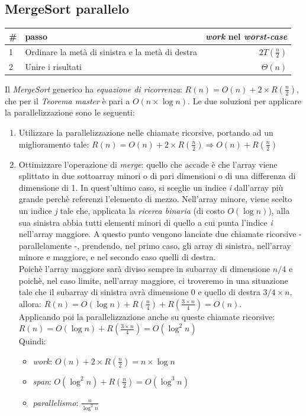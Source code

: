 \newpage

\subsection{MergeSort parallelo}
\begin{center}
	\begin{tabular}{| l | l | r |}
		\hline
		\textbf{\#} & \textbf{passo} & \textbf{\textit{work} nel \textit{worst-case}} \\ \hline
		1 & Ordinare la metà di sinistra e la metà di destra & $2T(\frac{n}{2})$ \\
		2 & Unire i risultati & $\Theta(n)$ \\
		\hline
	\end{tabular}
\end{center}
Il \textit{MergeSort} generico ha \textit{equazione di ricorrenza}: $R(n) = O(n) + 2\times R(\frac{n}{2})$, che per il \textit{Teorema master} \`e pari a $O(n\times \log n)$.
Le due soluzioni per applicare la parallelizzazione sono le seguenti:
\begin{enumerate}
	\item Utilizzare la parallelizzazione nelle chiamate ricorsive, portando ad un miglioramento tale: $R(n) = O(n) + 2\times R(\frac{n}{2}) \Rightarrow O(n) + R(\frac{n}{2})$
	\item Ottimizzare l'operazione di \textit{merge}: quello che accade \`e che l'array viene splittato in due sottoarray minori o di pari dimensioni o di una differenza di dimensione di 1. In quest'ultimo caso, si sceglie un indice \textit{i} dall'array pi\`u grande perch\`e referenzi l'elemento di mezzo. Nell'array minore, viene scelto un indice \textit{j} tale che, applicata la \textit{ricerca binaria} (di costo $O(\log n)$), alla sua sinistra abbia tutti elementi minori di quello a cui punta l'indice \textit{i} nell'array maggiore. A questo punto vengono lanciate due chiamate ricorsive - parallelamente -, prendendo, nel primo caso, gli array di sinistra, nell'array minore e maggiore, e nel secondo caso quelli di destra. \\
	Poich\`e l'array maggiore sar\`a diviso sempre in subarray di dimensione $n/4$ e poich\`e, nel caso limite, nell'array maggiore, ci troveremo in una situazione tale che il subarray di sinistra avr\`a dimensione $0$ e quello di destra $3/4 \times n$, allora: $R(n) = O(\log n) + R(\frac{n}{4}) + R(\frac{3\times n}{4}) = O(n)$. \\
	Applicando poi la parallelizzazione anche su queste chiamate ricorsive: $R(n) = O(\log n) + R(\frac{3\times n}{4}) = O(\log^2 n)$ \\
	Quindi:
	\begin{itemize}
		\item \textit{work}: $O(n) + 2\times R(\frac{n}{2}) = n \times \log n$
		\item \textit{span}: $O(\log^2 n) + R(\frac{n}{2}) = O(\log^3 n)$
		\item \textit{parallelismo}: $\frac{n}{\log^2 n}$
	\end{itemize}
\end{enumerate}


